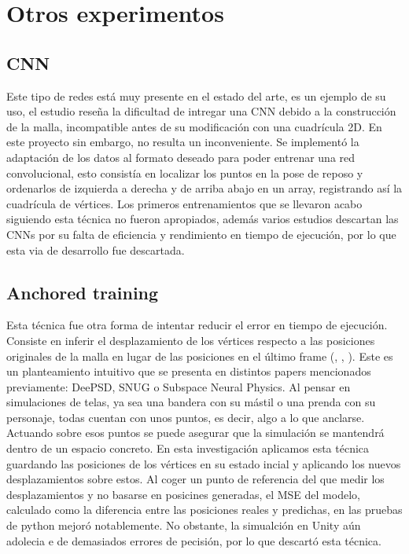 \chapter{Otros experimentos}
\label{appendix:otros}

\section*{CNN}
Este tipo de redes está muy presente en el estado del arte, \cite{chentanez_cloth_2020} es un ejemplo de su uso, el estudio reseña la dificultad de intregar una CNN debido a la construcción de la malla, incompatible antes de su modificación con una cuadrícula 2D. En este proyecto sin embargo, no resulta un inconveniente. Se implementó la adaptación de los datos al formato deseado para poder entrenar una red convolucional, esto consistía en localizar los puntos en la pose de reposo y ordenarlos de izquierda a derecha y de arriba abajo en un array, registrando así la cuadrícula de vértices. Los primeros entrenamientos que se llevaron acabo siguiendo esta técnica no fueron apropiados, además varios estudios descartan las CNNs por su falta de eficiencia y rendimiento en tiempo de ejecución, por lo que esta via de desarrollo fue descartada.


\section*{Anchored training} 
Esta técnica fue otra forma de intentar reducir el error en tiempo de ejecución. Consiste en inferir el desplazamiento de los vértices respecto a las posiciones originales de la malla en lugar de las posiciones en el último frame (\cite{bertiche_deepsd_2021}, \cite{santesteban2022snug}, \cite{holden_subspace_2019}). Este es un planteamiento intuitivo que se presenta en distintos papers mencionados previamente: DeePSD, SNUG o Subspace Neural Physics. Al pensar en simulaciones de telas, ya sea una bandera con su mástil o una prenda con su personaje, todas cuentan con unos puntos, es decir, algo a lo que anclarse. Actuando sobre esos puntos se puede asegurar que la simulación se mantendrá dentro de un espacio concreto. En esta investigación aplicamos esta técnica guardando las posiciones de los vértices en su estado incial y aplicando los nuevos desplazamientos sobre estos.
Al coger un punto de referencia del que medir los desplazamientos y no basarse en posicines generadas, el MSE del modelo, calculado como la diferencia entre las posiciones reales y predichas, en las pruebas de python mejoró notablemente. No obstante, la simualción en Unity aún adolecia e de demasiados errores de pecisión, por lo que descartó esta técnica.
        

